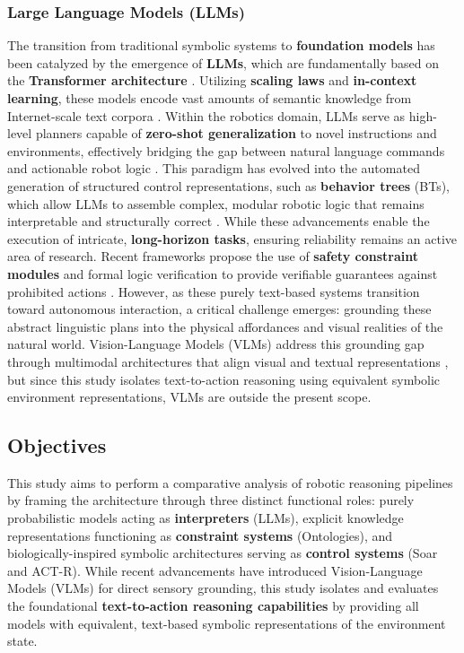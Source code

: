 \documentclass[a4paper]{article}
\begin{document}
\subsubsection{Large Language Models (LLMs)}
The transition from traditional symbolic systems to \textbf{foundation models} has been catalyzed by the emergence of \textbf{LLMs}, which are fundamentally based on the \textbf{Transformer architecture} \cite{vaswani2017attention}. Utilizing \textbf{scaling laws} and \textbf{in-context learning}, these models encode vast amounts of semantic knowledge from Internet-scale text corpora \cite{brown2020language}. Within the robotics domain, LLMs serve as high-level planners capable of \textbf{zero-shot generalization} to novel instructions and environments, effectively bridging the gap between natural language commands and actionable robot logic \cite{jeong2024survey}. This paradigm has evolved into the automated generation of structured control representations, such as \textbf{behavior trees} (BTs), which allow LLMs to assemble complex, modular robotic logic that remains interpretable and structurally correct \cite{lykov2024llm}. While these advancements enable the execution of intricate, \textbf{long-horizon tasks}, ensuring reliability remains an active area of research. Recent frameworks propose the use of \textbf{safety constraint modules} and formal logic verification to provide verifiable guarantees against prohibited actions \cite{yang2024plug}. However, as these purely text-based systems transition toward autonomous interaction, a critical challenge emerges: grounding these abstract linguistic plans into the physical affordances and visual realities of the natural world. Vision-Language Models (VLMs) address this grounding gap through multimodal architectures that align visual and textual representations \cite{radford2021learning, ahn2022can, zitkovich2023rt}, but since this study isolates text-to-action reasoning using equivalent symbolic environment representations, VLMs are outside the present scope.

\subsection{Objectives}
This study aims to perform a comparative analysis of robotic reasoning pipelines by framing the architecture through three distinct functional roles: purely probabilistic models acting as \textbf{interpreters} (LLMs), explicit knowledge representations functioning as \textbf{constraint systems} (Ontologies), and biologically-inspired symbolic architectures serving as \textbf{control systems} (Soar and ACT-R). While recent advancements have introduced Vision-Language Models (VLMs) for direct sensory grounding, this study isolates and evaluates the foundational \textbf{text-to-action reasoning capabilities} by providing all models with equivalent, text-based symbolic representations of the environment state.
\end{document}
